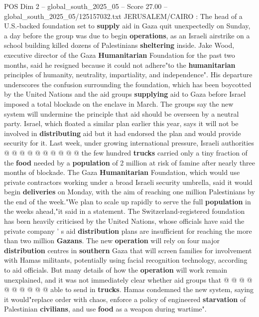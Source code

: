 \begin{textsample}{POS Dim 2 – global\_south\_2025\_05 – Score 27.00 – global\_south\_2025\_05/125157032.txt}  \label{ex:f2_pos_045}
JERUSALEM/CAIRO : The head of a U.S.-backed foundation set to \textbf{supply} aid in Gaza quit unexpectedly on Sunday, a day before the group was due to begin \textbf{operations}, as an Israeli airstrike on a school building killed dozens of Palestinians \textbf{sheltering} inside.
Jake Wood, executive director of the Gaza \textbf{Humanitarian} Foundation for the past two months, said he resigned because it could not adhere"to the \textbf{humanitarian} principles of humanity, neutrality, impartiality, and independence".
His departure underscores the confusion surrounding the foundation, which has been boycotted by the United Nations and the aid groups \textbf{supplying} aid to Gaza before Israel imposed a total blockade on the enclave in March.
The groups say the new system will undermine the principle that aid should be overseen by a neutral party.
Israel, which floated a similar plan earlier this year, says it will not be involved in \textbf{distributing} aid but it had endorsed the plan and would provide security for it.
Last week, under growing international pressure, Israeli authorities @ @ @ @ @ @ @ @ @ @ the few hundred \textbf{trucks} carried only a tiny fraction of the \textbf{food} needed by a \textbf{population} of 2 million at risk of famine after nearly three months of blockade.
The Gaza \textbf{Humanitarian} Foundation, which would use private contractors working under a broad Israeli security umbrella, said it would begin \textbf{deliveries} on Monday, with the aim of reaching one million Palestinians by the end of the week."We plan to scale up rapidly to serve the full \textbf{population} in the weeks ahead,"it said in a statement.
The Switzerland-registered foundation has been heavily criticised by the United Nations, whose officials have said the private company ' s aid \textbf{distribution} plans are insufficient for reaching the more than two million \textbf{Gazans}.
The new \textbf{operation} will rely on four major \textbf{distribution} centres in \textbf{southern} Gaza that will screen families for involvement with Hamas militants, potentially using facial recognition technology, according to aid officials.
But many details of how the \textbf{operation} will work remain unexplained, and it was not immediately clear whether aid groups that @ @ @ @ @ @ @ @ @ @ able to send in \textbf{trucks}.
Hamas condemned the new system, saying it would"replace order with chaos, enforce a policy of engineered \textbf{starvation} of Palestinian \textbf{civilians}, and use \textbf{food} as a weapon during wartime".

\end{textsample}
